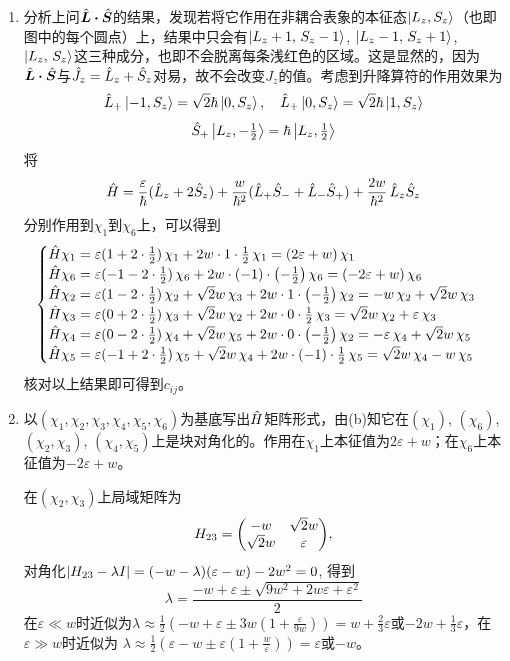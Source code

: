 \begin{enumerate}[label=\textbf{6.\Alph*}, listparindent=\parindent, leftmargin=-0.5mm]
\begin{enumerate}[listparindent=\parindent]
    \item 分析上问$\hat{\boldsymbol{L}}\boldsymbol{\cdot}\hat{\boldsymbol{S}}$的结果，发现若将它作用在非耦合表象的本征态$\ket{L_z,S_z}$（也即图中的每个圆点）上，结果中只会有$\ket{L_z+1,\,S_z-1}$, $\ket{L_z-1,\,S_z+1}$, $\ket{L_z,\,S_z}$这三种成分，也即不会脱离每条浅红色的区域。这是显然的，因为$\hat{\boldsymbol{L}}\boldsymbol{\cdot}\hat{\boldsymbol{S}}$与$\hat{J}_z=\hat{L}_z+\hat{S}_z$对易，故不会改变$J_z$的值。考虑到升降算符的作用效果为
    \[\hat{L}_+\ket{-1,S_z}=\sqrt{2}\hbar\ket{0,S_z},\quad\hat{L}_+\ket{0,S_z}=\sqrt{2}\hbar\ket{1,S_z}\]
    \[\hat{S}_+\ket{L_z,-\tfrac{1}{2}}=\hbar\ket{L_z,\tfrac{1}{2}}\]
    将
    \[\hat{H} = \frac{\varepsilon}{\hbar}(\hat{L}_z+2\hat{S}_z)+\frac{w}{\hbar^2}(\hat{L}_+\hat{S}_-+\hat{L}_-\hat{S}_+)+\frac{2w}{\hbar^2}\,\hat{L}_z\hat{S}_z\]
    分别作用到$\chi_1$到$\chi_6$上，可以得到
    \[\begin{cases}
    \hat{H}\chi_1 = \varepsilon(1+2\cdot\frac{1}{2})\,\chi_1+2w\cdot1\cdot\frac{1}{2}\,\chi_1=(2\varepsilon+w)\,\chi_1\\
    \hat{H}\chi_6 =\varepsilon(-1-2\cdot\frac{1}{2})\,\chi_6+2w\cdot(-1)\cdot\qty(-\frac{1}{2})\,\chi_6=(-2\varepsilon+w)\,\chi_6\\
    \hat{H}\chi_2 =\varepsilon(1-2\cdot\frac{1}{2})\,\chi_2+\sqrt{2}w\,\chi_3+2w\cdot1\cdot\qty(-\frac{1}{2})\,\chi_2=-w\,\chi_2+\sqrt{2}w\,\chi_3\\
    \hat{H}\chi_3 =\varepsilon(0+2\cdot\frac{1}{2})\,\chi_3+\sqrt{2}w\,\chi_2+2w\cdot0\cdot\frac{1}{2}\,\chi_3=\sqrt{2}w\,\chi_2+\varepsilon\,\chi_3\\
    \hat{H}\chi_4 =\varepsilon(0-2\cdot\frac{1}{2})\,\chi_4+\sqrt{2}w\,\chi_5+2w\cdot0\cdot\qty(-\frac{1}{2})\,\chi_2=-\varepsilon\,\chi_4+\sqrt{2}w\,\chi_5\\
    \hat{H}\chi_5 =\varepsilon(-1+2\cdot\frac{1}{2})\,\chi_5+\sqrt{2}w\,\chi_4+2w\cdot(-1)\cdot\frac{1}{2}\,\chi_5=\sqrt{2}w\,\chi_4-w\,\chi_5
    \end{cases}\]
    核对以上结果即可得到$c_{ij}$。
    \item 以$(\chi_1,\chi_2,\chi_3,\chi_4,\chi_5,\chi_6)$为基底写出$\hat{H}$矩阵形式，由(b)知它在$(\chi_1)$, $(\chi_6)$, $(\chi_2,\chi_3)$, $(\chi_4,\chi_5)$上是块对角化的。作用在$\chi_1$上本征值为$2\varepsilon+w$；在$\chi_6$上本征值为$-2\varepsilon+w$。
    
    在$(\chi_2,\chi_3)$上局域矩阵为
    \[H_{23} = \mqty(-w&\sqrt{2}w\\\sqrt{2}w&\varepsilon),\]
    对角化$\abs{H_{23}-\lambda I}=(-w-\lambda)(\varepsilon-w)-2w^2=0$, 得到
    \[\lambda = \frac{-w+\varepsilon \pm\sqrt{9w^2+2w\varepsilon+\varepsilon^2}}{2}\]
    在$\varepsilon\ll w$时近似为$\lambda\approx\frac{1}{2}(-w+\varepsilon\pm 3w(1+\frac{\varepsilon}{9w}))=w+\frac{2}{3}\varepsilon$或$-2w+\frac{1}{3}\varepsilon$，在$\varepsilon\gg w$时近似为
    $\lambda\approx\frac{1}{2}(\varepsilon-w\pm\varepsilon(1+\frac{w}{\varepsilon}))=\varepsilon$或$-w$。
    

\end{enumerate}
\end{enumerate}
